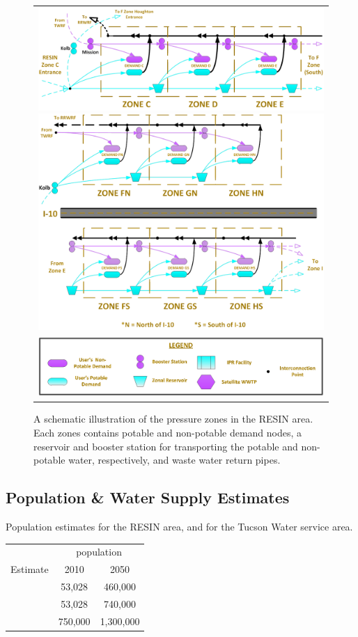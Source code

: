 \documentclass[opre,nonblindrev]{informs3} %
\begin{document}
\begin{figure}
	\FIGURE
	{%
		\begin{tabular}{c}
			\includegraphics*[width=.5\textwidth]{tucson_water_images/zones_c_e.png}%
			\includegraphics*[width=.5\textwidth]{tucson_water_images/zones_split.png} \\
			\includegraphics*[width=.6\textwidth]{tucson_water_images/zones_legend.png}
		\end{tabular}
	}
	{
		A schematic illustration of the pressure zones in the RESIN area.
		Each zones contains potable and non-potable demand nodes, a reservoir and booster station for transporting the potable and non-potable water, respectively, and waste water return pipes.
		\label{fig:tucson_zones}
	}
	{}
\end{figure}


\subsection{Population \& Water Supply Estimates}
\label{ssec:population_supply_estimates}

\begin{table}
	\TABLE
	{
		Population estimates for the RESIN area, and for the Tucson Water service area.
		\label{tb:population}
	}
	{\begin{tabular}{lcc}
		\hline
		         & \multicolumn{2}{c}{population} \\
		Estimate & 2010 & 2050 \\
		\hline
		\cite{taz}    &  53,028 &   460,000 \\
		\cite{wisp}   &  53,028 &   740,000 \\
		\hline
		\cite{tucson} & 750,000 & 1,300,000 \\
		\hline
	\end{tabular}}
	{}
\end{table}
\end{document}
